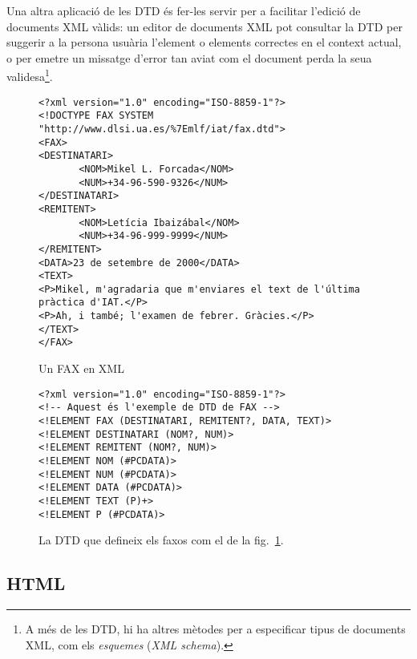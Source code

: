   Una altra aplicació de les DTD és fer-les servir per a facilitar
  l'edició de documents XML vàlids: un editor de documents XML pot
  consultar la DTD per suggerir a la persona usuària l'element o
  elements correctes en el context actual, o per emetre un missatge
  d'error tan aviat com el document perda la seua validesa\footnote{A
  més de les DTD, hi ha altres mètodes per a especificar tipus de
  documents XML, com els \emph{esquemes} (\emph{XML schema}).}. 


\begin{figure}
\begin{center}
\begin{verbatim}
<?xml version="1.0" encoding="ISO-8859-1"?>
<!DOCTYPE FAX SYSTEM "http://www.dlsi.ua.es/%7Emlf/iat/fax.dtd">
<FAX>
<DESTINATARI>
       <NOM>Mikel L. Forcada</NOM>
       <NUM>+34-96-590-9326</NUM>
</DESTINATARI>
<REMITENT>
       <NOM>Letícia Ibaizábal</NOM>
       <NUM>+34-96-999-9999</NUM>
</REMITENT>
<DATA>23 de setembre de 2000</DATA>
<TEXT>
<P>Mikel, m'agradaria que m'enviares el text de l'última
pràctica d'IAT.</P>
<P>Ah, i també; l'examen de febrer. Gràcies.</P>
</TEXT>
</FAX>
\end{verbatim}
\end{center}
\caption{Un FAX en XML}
\label{fg:faxXML}
\end{figure}

\begin{figure}
\begin{center}
\begin{verbatim}
<?xml version="1.0" encoding="ISO-8859-1"?>
<!-- Aquest és l'exemple de DTD de FAX -->
<!ELEMENT FAX (DESTINATARI, REMITENT?, DATA, TEXT)>
<!ELEMENT DESTINATARI (NOM?, NUM)>
<!ELEMENT REMITENT (NOM?, NUM)>
<!ELEMENT NOM (#PCDATA)>
<!ELEMENT NUM (#PCDATA)>
<!ELEMENT DATA (#PCDATA)>
<!ELEMENT TEXT (P)+>
<!ELEMENT P (#PCDATA)>
\end{verbatim}
\end{center}
\caption{La DTD que defineix els faxos com el de la fig.~\ref{fg:faxXML}.}
\label{fg:faxDTD}
\end{figure}

\subsection{HTML}


